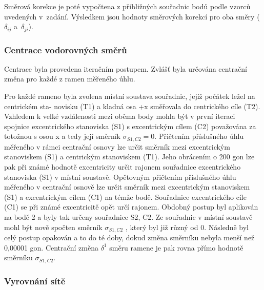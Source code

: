 Směrová korekce je poté vypočtena z přibližných souřadnic bodů podle vzorců uvedených v~zadání. Výsledkem jsou hodnoty směrových korekcí pro oba směry ($\delta_{ij}$ a~$\delta_{ji}$).


\subsubsection{Centrace vodorovných směrů}
\tab Centrace byla provedena iteračním postupem. Zvlášť byla určována centrační změna pro každé
z ramen měřeného úhlu.

Pro každé rameno byla zvolena místní soustava souřadnic, jejíž počátek ležel na centrickém sta-
novisku (T1) a kladná osa +x směřovala do centrického cíle (T2). Vzhledem k velké vzdálenosti
mezi oběma body mohla být v první iteraci spojnice excentrického stanoviska (S1) s excentrickým
cílem (C2) považována za totožnou s osou x a tedy její směrník $\sigma_{S1,C2} = 0$. Přičtením příslušného úhlu měřeného v rámci centrační osnovy lze určit směrník mezi excentrickým stanoviskem (S1) a centrickým stanoviskem (T1). Jeho obrácením o 200 gon lze pak při známé hodnotě excentricity
určit rajonem souřadnice excentrického stanoviska (S1) v místní soustavě. Opětovným přičtením
příslušného úhlu měřeného v centrační osnově lze určit směrník mezi excentrickým stanoviskem
(S1) a excentrickým cílem (C1) na témže bodě. Souřadnice excentrického cíle (C1) se při známé
excentricitě opět určí rajonem. Obdobný postup byl aplikován na bodě 2 a byly tak určeny souřadnice S2, C2. Ze souřadnic v místní soustavě mohl být nově spočten směrník $\sigma_{S1,C2}$ , který byl již různý od 0. Následně byl celý postup opakován a to do té doby, dokud změna směrníku nebyla
menší než 0,00001 gon. Centrační změna $\delta^1$ směru ramene je pak rovna přímo hodnotě směrníku
$\sigma_{S1,C2}$.



\subsubsection{Vyrovnání sítě}
